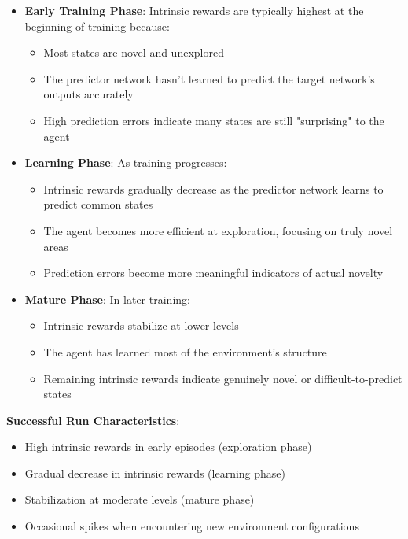 \documentclass[12pt]{article}
\begin{document}
{{{\begin{itemize}[noitemsep]
\begin{enumerate}
    \begin{itemize}
        \item \textbf{Early Training Phase}: Intrinsic rewards are typically highest at the beginning of training because:
        \begin{itemize}
            \item Most states are novel and unexplored
            \item The predictor network hasn't learned to predict the target network's outputs accurately
            \item High prediction errors indicate many states are still "surprising" to the agent
        \end{itemize}
        
        \item \textbf{Learning Phase}: As training progresses:
        \begin{itemize}
            \item Intrinsic rewards gradually decrease as the predictor network learns to predict common states
            \item The agent becomes more efficient at exploration, focusing on truly novel areas
            \item Prediction errors become more meaningful indicators of actual novelty
        \end{itemize}
        
        \item \textbf{Mature Phase}: In later training:
        \begin{itemize}
            \item Intrinsic rewards stabilize at lower levels
            \item The agent has learned most of the environment's structure
            \item Remaining intrinsic rewards indicate genuinely novel or difficult-to-predict states
        \end{itemize}
    \end{itemize}
    
    \textbf{Successful Run Characteristics}:
    \begin{itemize}
        \item High intrinsic rewards in early episodes (exploration phase)
        \item Gradual decrease in intrinsic rewards (learning phase)
        \item Stabilization at moderate levels (mature phase)
        \item Occasional spikes when encountering new environment configurations
    \end{itemize}
    

\end{enumerate}
\end{itemize}}}}
\end{document}
